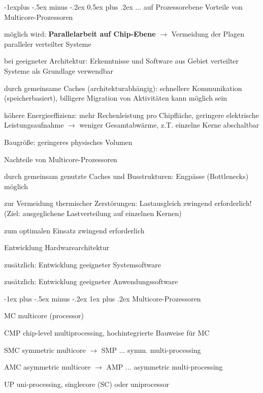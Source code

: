 \documentclass[a4paper]{article}
\makeatletter
\renewcommand{\subsection}{\@startsection{subsection}{2}{0mm}%
 {-1explus -.5ex minus -.2ex}%
 {0.5ex plus .2ex}%
 {\normalfont\normalsize\bfseries}}
\renewcommand{\subsubsection}{\@startsection{subsubsection}{3}{0mm}%
 {-1ex plus -.5ex minus -.2ex}%
 {1ex plus .2ex}%
 {\normalfont\small\bfseries}}
\makeatother
\begin{document}
\begin{multicols}{3}
    \subsection{... auf Prozessorebene}
    Vorteile von Multicore-Prozessoren
    \begin{enumerate*}
        \item möglich wird: \textbf{Parallelarbeit auf Chip-Ebene} $\rightarrow$ Vermeidung der Plagen paralleler verteilter Systeme
        \item bei geeigneter Architektur: Erkenntnisse und Software aus Gebiet verteilter Systeme als Grundlage verwendbar
        \item durch gemeinsame Caches (architekturabhängig): schnellere Kommunikation (speicherbasiert), billigere Migration von Aktivitäten kann möglich sein
        \item höhere Energieeffizienz: mehr Rechenleistung pro Chipfläche, geringere elektrische Leistungsaufnahme $\rightarrow$ weniger Gesamtabwärme, z.T. einzelne Kerne abschaltbar
        \item Baugröße: geringeres physisches Volumen
    \end{enumerate*}

    Nachteile von Multicore-Prozessoren
    \begin{enumerate*}
        \item durch gemeinsam genutzte Caches und Busstrukturen: Engpässe (Bottlenecks) möglich
        \item zur Vermeidung thermischer Zerstörungen: Lastausgleich zwingend erforderlich! (Ziel: ausgeglichene Lastverteilung auf einzelnen Kernen)
    \end{enumerate*}

    zum optimalen Einsatz zwingend erforderlich
    \begin{enumerate*}
        \item Entwicklung Hardwarearchitektur
        \item zusätzlich: Entwicklung geeigneter Systemsoftware
        \item zusätzlich: Entwicklung geeigneter Anwendungssoftware
    \end{enumerate*}

    \subsubsection{Multicore-Prozessoren}
    \begin{description*}
        \item[MC] multicore (processor)
        \item[CMP] chip-level multiprocessing, hochintegrierte Bauweise für MC
        \item[SMC] symmetric multicore $\rightarrow$ SMP ... symm. multi-processing
        \item[AMC] asymmetric multicore $\rightarrow$ AMP ... asymmetric multi-processing
        \item[UP] uni-processing, singlecore (SC) oder uniprocessor
    \end{description*}


\end{multicols}
\end{document}
